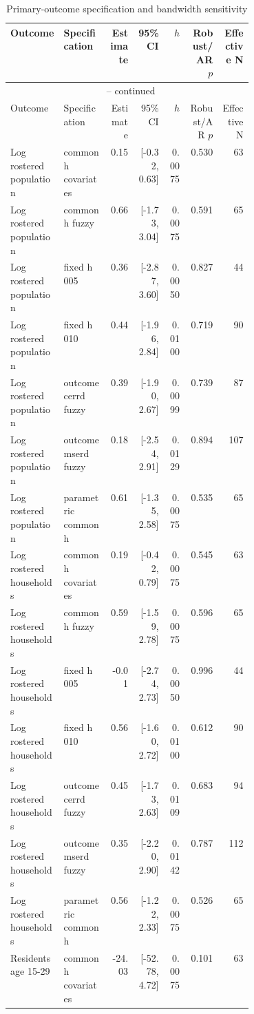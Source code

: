 \begingroup
\scriptsize
\begin{longtable}{p{0.22\linewidth}p{0.19\linewidth}rrrrr}
\caption{Primary-outcome specification and bandwidth sensitivity}
\label{tab:rd_outcomes_robustness_2013_ccpp} \\
\toprule
Outcome & Specification & Estimate & 95\% CI & \(h\) & Robust/AR \(p\) & Effective N \\
\midrule
\endfirsthead
\multicolumn{7}{c}{\tablename\ \thetable{} -- continued} \\
\toprule
Outcome & Specification & Estimate & 95\% CI & \(h\) & Robust/AR \(p\) & Effective N \\
\midrule
\endhead
Log rostered population & common h covariates & 0.15 & [-0.32, 0.63] & 0.0075 & 0.530 & 63 \\
Log rostered population & common h fuzzy & 0.66 & [-1.73, 3.04] & 0.0075 & 0.591 & 65 \\
Log rostered population & fixed h 005 & 0.36 & [-2.87, 3.60] & 0.0050 & 0.827 & 44 \\
Log rostered population & fixed h 010 & 0.44 & [-1.96, 2.84] & 0.0100 & 0.719 & 90 \\
Log rostered population & outcome cerrd fuzzy & 0.39 & [-1.90, 2.67] & 0.0099 & 0.739 & 87 \\
Log rostered population & outcome mserd fuzzy & 0.18 & [-2.54, 2.91] & 0.0129 & 0.894 & 107 \\
Log rostered population & parametric common h & 0.61 & [-1.35, 2.58] & 0.0075 & 0.535 & 65 \\
Log rostered households & common h covariates & 0.19 & [-0.42, 0.79] & 0.0075 & 0.545 & 63 \\
Log rostered households & common h fuzzy & 0.59 & [-1.59, 2.78] & 0.0075 & 0.596 & 65 \\
Log rostered households & fixed h 005 & -0.01 & [-2.74, 2.73] & 0.0050 & 0.996 & 44 \\
Log rostered households & fixed h 010 & 0.56 & [-1.60, 2.72] & 0.0100 & 0.612 & 90 \\
Log rostered households & outcome cerrd fuzzy & 0.45 & [-1.73, 2.63] & 0.0109 & 0.683 & 94 \\
Log rostered households & outcome mserd fuzzy & 0.35 & [-2.20, 2.90] & 0.0142 & 0.787 & 112 \\
Log rostered households & parametric common h & 0.56 & [-1.22, 2.33] & 0.0075 & 0.526 & 65 \\
Residents age 15-29 & common h covariates & -24.03 & [-52.78, 4.72] & 0.0075 & 0.101 & 63 \\

\end{longtable}
